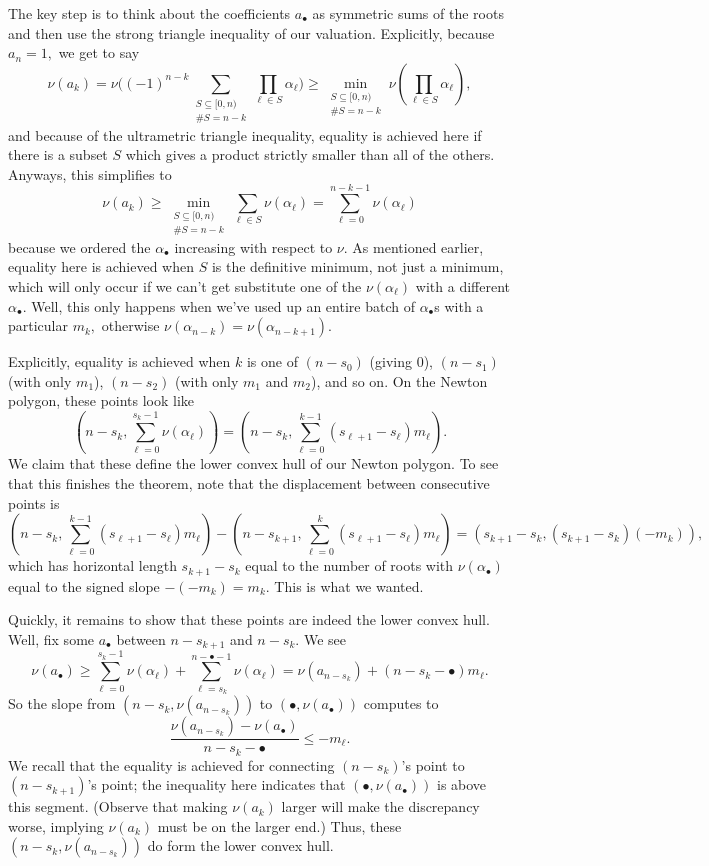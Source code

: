 The key step is to think about the coefficients $a_\bullet$ as symmetric sums of the roots and then use the strong triangle inequality of our valuation. Explicitly, because $a_n=1,$ we get to say
\[\nu(a_k)=\nu\Bigg((-1)^{n-k}\sum_{\substack{S\subseteq[0,n)\\\#S=n-k}}\prod_{\ell\in S}\alpha_\ell\Bigg)\ge\min_{\substack{S\subseteq[0,n)\\\#S=n-k}}\nu\left(\prod_{\ell\in S}\alpha_\ell\right),\]
and because of the ultrametric triangle inequality, equality is achieved here if there is a subset $S$ which gives a product strictly smaller than all of the others. Anyways, this simplifies to
\[\nu(a_k)\ge\min_{\substack{S\subseteq[0,n)\\\#S=n-k}}\sum_{\ell\in S}\nu(\alpha_\ell)=\sum_{\ell=0}^{n-k-1}\nu(\alpha_\ell)\]
because we ordered the $\alpha_\bullet$ increasing with respect to $\nu.$ As mentioned earlier, equality here is achieved when $S$ is the definitive minimum, not just a minimum, which will only occur if we can't get substitute one of the $\nu(\alpha_\ell)$ with a different $\alpha_\bullet.$ Well, this only happens when we've used up an entire batch of $\alpha_\bullet$s with a particular $m_k,$ otherwise $\nu(\alpha_{n-k})=\nu(\alpha_{n-k+1}).$

Explicitly, equality is achieved when $k$ is one of $(n-s_0)$ (giving $0$), $(n-s_1)$ (with only $m_1$), $(n-s_2)$ (with only $m_1$ and $m_2$), and so on. On the Newton polygon, these points look like
\[\left(n-s_k,\sum_{\ell=0}^{s_k-1}\nu(\alpha_\ell)\right)=\left(n-s_k,\sum_{\ell=0}^{k-1}(s_{\ell+1}-s_\ell)m_\ell\right).\]
We claim that these define the lower convex hull of our Newton polygon. To see that this finishes the theorem, note that the displacement between consecutive points is
\[\left(n-s_k,\sum_{\ell=0}^{k-1}(s_{\ell+1}-s_\ell)m_\ell\right)-\left(n-s_{k+1},\sum_{\ell=0}^k(s_{\ell+1}-s_\ell)m_\ell\right)=(s_{k+1}-s_k,(s_{k+1}-s_k)(-m_k)),\]
which has horizontal length $s_{k+1}-s_k$ equal to the number of roots with $\nu(\alpha_\bullet)$ equal to the signed slope $-(-m_k)=m_k.$ This is what we wanted.

Quickly, it remains to show that these points are indeed the lower convex hull. Well, fix some $a_\bullet$ between $n-s_{k+1}$ and $n-s_k.$ We see
\[\nu(a_\bullet)\ge\sum_{\ell=0}^{s_k-1}\nu(\alpha_\ell)+\sum_{\ell=s_k}^{n-\bullet-1}\nu(\alpha_\ell)=\nu(a_{n-s_k})+(n-s_k-\bullet)m_\ell.\]
So the slope from $(n-s_k,\nu(a_{n-s_k}))$ to $(\bullet,\nu(a_\bullet))$ computes to
\[\frac{\nu(a_{n-s_k})-\nu(a_\bullet)}{n-s_k-\bullet}\le-m_\ell.\]
We recall that the equality is achieved for connecting $(n-s_k)$'s point to $(n-s_{k+1})$'s point; the inequality here indicates that $(\bullet,\nu(a_\bullet))$ is above this segment. (Observe that making $\nu(a_k)$ larger will make the discrepancy worse, implying $\nu(a_k)$ must be on the larger end.) Thus, these $(n-s_k,\nu(a_{n-s_k}))$ do form the lower convex hull.

